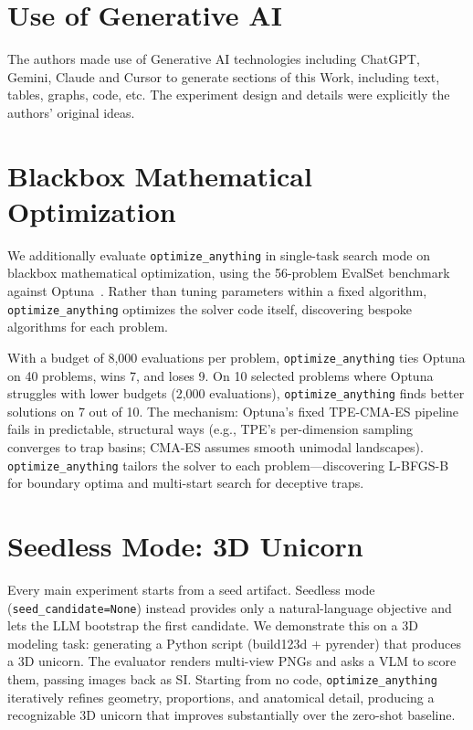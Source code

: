 \documentclass[sigconf]{acmart}
\newcommand{\oa}{\texttt{optimize\_anything}}
\newcommand{\asi}{SI}
\begin{document}



\newpage

\appendix

\section{Use of Generative AI}
The authors made use of Generative AI technologies including ChatGPT, Gemini, Claude and Cursor to generate sections of this Work, including text, tables, graphs, code, etc. The experiment design and details were explicitly the authors' original ideas.

\section{Blackbox Mathematical Optimization}\label{app:optuna}

We additionally evaluate \oa{} in single-task search mode on blackbox mathematical optimization, using the 56-problem EvalSet benchmark~\cite{evalset2018} against Optuna~\cite{akiba2019optuna}. Rather than tuning parameters within a fixed algorithm, \oa{} optimizes the solver code itself, discovering bespoke algorithms for each problem.

With a budget of 8,000 evaluations per problem, \oa{} ties Optuna on 40 problems, wins 7, and loses 9. On 10 selected problems where Optuna struggles with lower budgets (2,000 evaluations), \oa{} finds better solutions on 7 out of 10. The mechanism: Optuna's fixed TPE-CMA-ES pipeline fails in predictable, structural ways (e.g., TPE's per-dimension sampling converges to trap basins; CMA-ES assumes smooth unimodal landscapes). \oa{} tailors the solver to each problem---discovering L-BFGS-B for boundary optima and multi-start search for deceptive traps.


\section{Seedless Mode: 3D Unicorn}\label{app:unicorn}

Every main experiment starts from a seed artifact. Seedless mode (\texttt{seed\_candidate=None}) instead provides only a natural-language objective and lets the LLM bootstrap the first candidate. We demonstrate this on a 3D modeling task: generating a Python script (build123d + pyrender) that produces a 3D unicorn. The evaluator renders multi-view PNGs and asks a VLM to score them, passing images back as \asi{}. Starting from no code, \oa{} iteratively refines geometry, proportions, and anatomical detail, producing a recognizable 3D unicorn that improves substantially over the zero-shot baseline.
\end{document}
